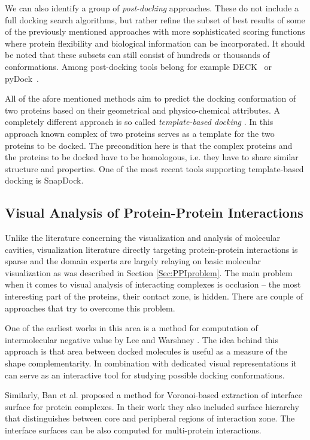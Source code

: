 We can also identify a group of \textit{post-docking} approaches. These do not include a full docking search algorithms, but rather refine the subset of best results of some of the previously mentioned approaches with more sophisticated scoring functions where protein flexibility and biological information can be incorporated. It should be noted that these subsets can still consist of hundreds or thousands of conformations. Among post-docking tools belong for example DECK~\cite{liu2011deck} or pyDock~\cite{cheng2007pydock, jimenez2013pydockweb}.

All of the afore mentioned methods aim to predict the docking conformation of two proteins based on their geometrical and physico-chemical attributes. A completely different approach is so called \textit{template-based docking} \cite{szilagyi2014template}. In this approach known complex of two proteins serves as a template for the two proteins to be docked. The precondition here is that the complex proteins and the proteins to be docked have to be homologous, i.e. they have to share similar structure and properties. One of the most recent tools supporting template-based docking is SnapDock\cite{estrin2017snapdock}.

\subsection{Visual Analysis of Protein-Protein Interactions}
Unlike the literature concerning the visualization and analysis of molecular cavities, visualization literature directly targeting protein-protein interactions is sparse and the domain experts are largely relaying on basic molecular visualization as was described in Section \ref{Sec:PPIproblem}. The main problem when it comes to visual analysis of interacting complexes is occlusion -- the most interesting part of the proteins, their contact zone, is hidden. There are couple of approaches that try to overcome this problem.

One of the earliest works in this area is a method for computation of intermolecular negative value by Lee and Warshney \cite{lee2006computing}. The idea behind this approach is that area between docked molecules is useful as a measure of the shape complementarity. In combination with dedicated visual representations it can serve as an interactive tool for studying possible docking conformations.

Similarly, Ban et al. \cite{ban2006interface} proposed a method for Voronoi-based extraction of interface surface for protein complexes. In their work they also included surface hierarchy that distinguishes between core and peripheral regions of interaction zone. The interface surfaces can be also computed for multi-protein interactions.

